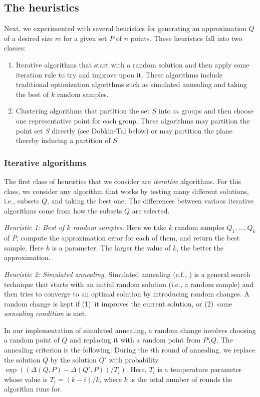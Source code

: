 \documentclass{elsart}
\begin{document}
\subsection{The heuristics}

Next, we experimented with several heuristics for generating an
approximation $Q$ of a desired size $m$ for a given set $P$ of $n$
points.  These heuristics fall into two classes:

\begin{enumerate}
\item Iterative algorithms that start with a random solution and then
apply some iteration rule to try and improve upon it. These algorithms
include traditional optimization algorithms such as simulated
annealing and taking the best of $k$ random samples.

\item Clustering algorithms that partition the set $S$ into $m$ groups
and then choose one representative point for each group.  These
algorithms may partition the point set $S$ directly (see Dobkin-Tal
below) or may partition the plane thereby inducing a partition of $S$.
\end{enumerate}

\subsubsection{Iterative algorithms}

The first class of heuristics that we consider are \emph{iterative}
algorithms.  For this class, we consider any algorithm that works by
testing many different solutions, i.e., subsets $Q$, and taking the
best one.  The differences between various iterative algorithms come
from how the subsets $Q$ are selected.

\emph{Heuristic 1: Best of $k$ random samples.}
Here we take $k$ random samples $Q_1,\ldots,Q_k$ of $P$, compute the
approximation error for each of them, and return the best sample.
Here $k$ is a parameter.  The larger the value of $k$, the better
the approximation.

\emph{Heuristic 2: Simulated annealing.}
Simulated annealing (c.f., \cite{h01}) is a general search technique
that starts with an initial random solution (i.e., a random sample)
and then tries to converge to an optimal solution by introducing
random changes.  A random change is kept if (1)~it improves the
current solution, or (2)~some \emph{annealing condition} is met.

In our implementation of simulated annealing, a random change involves
choosing a random point of $Q$ and replacing it with a random point
from $P\setminus Q$.  The annealing criterion is the following: During
the $i$th round of annealing, we replace the solution $Q$ by the
solution $Q'$ with probability $\exp((\Delta(Q,P)-\Delta(Q',P))/T_i)$.
Here, $T_i$ is a temperature parameter whose value is $T_i=(k-i)/k$,
where $k$ is the total number of rounds the algorithm runs for.
\end{document}
